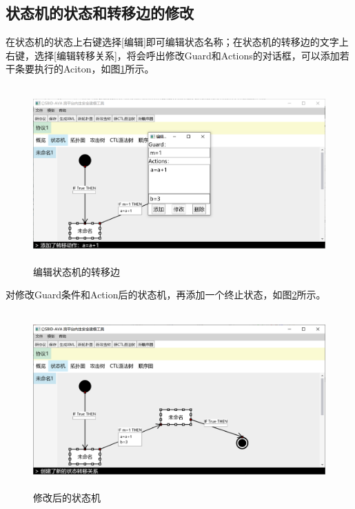 \subsection{状态机的状态和转移边的修改}
在状态机的状态上右键选择[编辑]即可编辑状态名称；在状态机的转移边的文字上右键，选择[编辑转移关系]，将会呼出修改Guard和Actions的对话框，可以添加若干条要执行的Aciton，如图\ref{statemachine_edit_action}所示。
\begin{figure}[h]
	\centering
	\includegraphics[width=12cm,height=6.75cm]{imgs/statemachine_edit_action.png}
	\caption{编辑状态机的转移边}
	\label{statemachine_edit_action}
\end{figure}
\par
对修改Guard条件和Action后的状态机，再添加一个终止状态，如图\ref{statemachine_edited_action}所示。
\begin{figure}[h]
	\centering
	\includegraphics[width=12cm,height=6.75cm]{imgs/statemachine_edited_action.png}
	\caption{修改后的状态机}
	\label{statemachine_edited_action}
\end{figure}

